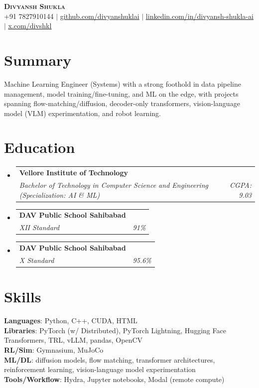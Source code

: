 \documentclass[letterpaper,11pt]{article}
\makeatletter
\newcommand{\resumeSubheading}[4]{
  \vspace{-2pt}\item
    \begin{tabular*}{0.97\textwidth}[t]{l@{\extracolsep{\fill}}r}
      \textbf{#1} & #2 \\
      \textit{\small#3} & \textit{\small #4} \\
    \end{tabular*}\vspace{-8pt}
}
\newcommand{\resumeSubHeadingListStart}{\begin{itemize}[leftmargin=0.15in, label={}, itemsep=0pt]}
\newcommand{\resumeSubHeadingListEnd}{\end{itemize}\vspace{-6pt}}
\makeatother
\begin{document}
\begin{center}
    \textbf{\Huge \scshape Divyansh Shukla} \\ \vspace{1pt}
    \small +91 7827910144 $|$
    \href{https://github.com/divyanshuklai}{\underline{github.com/divyanshuklai}} $|$
    \href{https://www.linkedin.com/in/divyansh-shukla-ai/}{\underline{linkedin.com/in/divyansh-shukla-ai}} $|$
    \href{https://x.com/divshkl}{\underline{x.com/divshkl}}
\end{center}

\section{Summary}
\small{Machine Learning Engineer (Systems) with a strong foothold in data pipeline management, model training/fine-tuning, and ML on the edge, with projects spanning flow-matching/diffusion, decoder-only transformers, vision-language model (VLM) experimentation, and robot learning.}

\section{Education}
  \resumeSubHeadingListStart
    \resumeSubheading
      {Vellore Institute of Technology}{}
      {Bachelor of Technology in Computer Science and Engineering (Specialization: AI \& ML)}{CGPA: 9.03}
    \resumeSubheading
      {DAV Public School Sahibabad}{}
      {XII Standard}{91\%}
    \resumeSubheading
      {DAV Public School Sahibabad}{}
      {X Standard}{95.6\%}
  \resumeSubHeadingListEnd

\section{Skills}
 \begin{itemize}[leftmargin=0.15in, label={}]
    \small{\item{
     \textbf{Languages}{: Python, C++, CUDA, HTML} \\
     \textbf{Libraries}{: PyTorch (w/ Distributed), PyTorch Lightning, Hugging Face Transformers, TRL, vLLM, pandas, OpenCV} \\
     \textbf{RL/Sim}{: Gymnasium, MuJoCo} \\
     \textbf{ML/DL}{: diffusion models, flow matching, transformer architectures, reinforcement learning, vision-language model experimentation} \\
     \textbf{Tools/Workflow}{: Hydra, Jupyter notebooks, Modal (remote compute)}
    }}
 \end{itemize}
\end{document}
